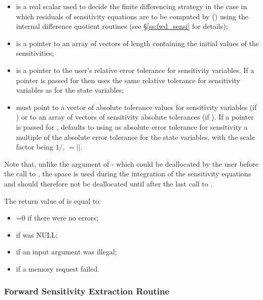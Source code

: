\begin{itemize}
\item {} 
  is a real scalar used to decide the finite differencing strategy
  in the case in which residuals of sensitivity equations are to be 
  computed by {\cvodes} () using the internal difference
  quotient routines (see \S\ref{ss:fwd_sensi} for details);
  
\item {} 
  is a pointer to an array of  vectors of length  containing the initial 
  values of the sensitivities;
  
\item {} 
  is a pointer to the user's relative error tolerance for sensitivity variables.
  If a  pointer is passed for  then {\cvodes} uses the same
  relative tolerance for sensitivity variables as for the state variables;
  
\item {} 
  must point to a vector of  absolute tolerance values for sensitivity variables 
  (if ) or to an array of  vectors of sensitivity absolute tolerances
  (if ).
  If a  pointer is passed for , {\cvodes} defaults to using
  as absolute error tolerance for sensitivity  a multiple of the
  absolute error tolerance for the state variables, with the scale factor
  being $1/$, $=|$$|$.
  
\end{itemize}
Note that, unlike the argument  of  - which could be deallocated
by the user before the call to , the space  is used during the
integration of the sensitivity equations and should therefore not be deallocated until
after the last call to .

The return value  of  is equal to: 
\begin{itemize}
\item {}=0 if there were no errors; 
\item {} if  was NULL;
\item {} if an input argument was illegal;
\item {} if a memory request failed. 
\end{itemize}

\subsubsection{Forward Sensitivity Extraction Routine}\label{sss:cvodesensextract}

